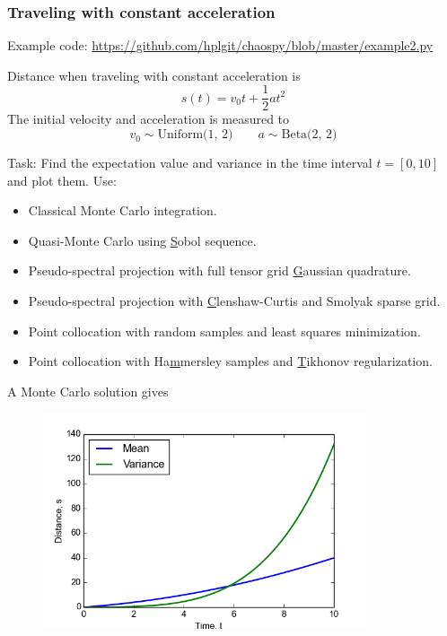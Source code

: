 \documentclass[handout]{beamer}
\begin{document}
\begin{frame}
\frametitle{Traveling with constant acceleration}
\scriptsize
%   
    \begin{alert}{Example code:}
\href{https://github.com/hplgit/chaospy/blob/master/example2.py}{https://github.com/hplgit/chaospy/blob/master/example2.py}\newline
  \end{alert}  
 


 Distance when traveling with constant acceleration is
 \[s(t) = v_0t + \frac{1}{2}at^2\]
\pause
The initial velocity and acceleration is measured to
\[v_0 \sim \text{Uniform(1, 2)} \qquad a \sim \text{Beta(2, 2)}\]
\pause
\begin{alert}{Task:}
Find the expectation value and variance in the time interval $t=[0,10]$  and plot them. Use:
\begin{itemize}
    \item Classical Monte Carlo integration.
    \item Quasi-Monte Carlo using \underline{S}obol sequence.
    \item Pseudo-spectral projection with full tensor grid \underline{G}aussian quadrature.
    \item Pseudo-spectral projection with \underline{C}lenshaw-Curtis and Smolyak sparse grid.
    \item Point collocation with random samples and least squares
        minimization.
    \item Point collocation with Ha\underline{m}mersley samples and \underline{T}ikhonov regularization.
\end{itemize}
\end{alert}
\end{frame}

\begin{frame}{A Monte Carlo solution gives}
 \begin{figure}
  \includegraphics[width=0.85\textwidth]{solution2.png}
 \end{figure}

\end{frame}
\end{document}
